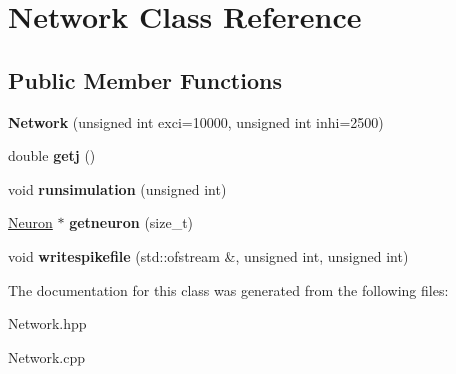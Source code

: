 \hypertarget{classNetwork}{\section{Network Class Reference}
\label{classNetwork}
}
\subsection*{Public Member Functions}
\begin{DoxyCompactItemize}
\item 
\hypertarget{classNetwork_a73816b55981c426f7e41d049b7ee4643}{{\bfseries Network} (unsigned int exci=10000, unsigned int inhi=2500)}\label{classNetwork_a73816b55981c426f7e41d049b7ee4643}

\item 
\hypertarget{classNetwork_a085df1c38e1d0332fdf29de4740dc71c}{double {\bfseries getj} ()}\label{classNetwork_a085df1c38e1d0332fdf29de4740dc71c}

\item 
\hypertarget{classNetwork_ab59874bad4191179464d67abec9e6481}{void {\bfseries runsimulation} (unsigned int)}\label{classNetwork_ab59874bad4191179464d67abec9e6481}

\item 
\hypertarget{classNetwork_a6959511f813566a6a69cea7482156b0d}{\hyperlink{classNeuron}{Neuron} $\ast$ {\bfseries getneuron} (size\-\_\-t)}\label{classNetwork_a6959511f813566a6a69cea7482156b0d}

\item 
\hypertarget{classNetwork_a77b69ef86e18061318dc9c964331afb3}{void {\bfseries writespikefile} (std\-::ofstream \&, unsigned int, unsigned int)}\label{classNetwork_a77b69ef86e18061318dc9c964331afb3}

\end{DoxyCompactItemize}


The documentation for this class was generated from the following files\-:\begin{DoxyCompactItemize}
\item 
Network.\-hpp\item 
Network.\-cpp\end{DoxyCompactItemize}
